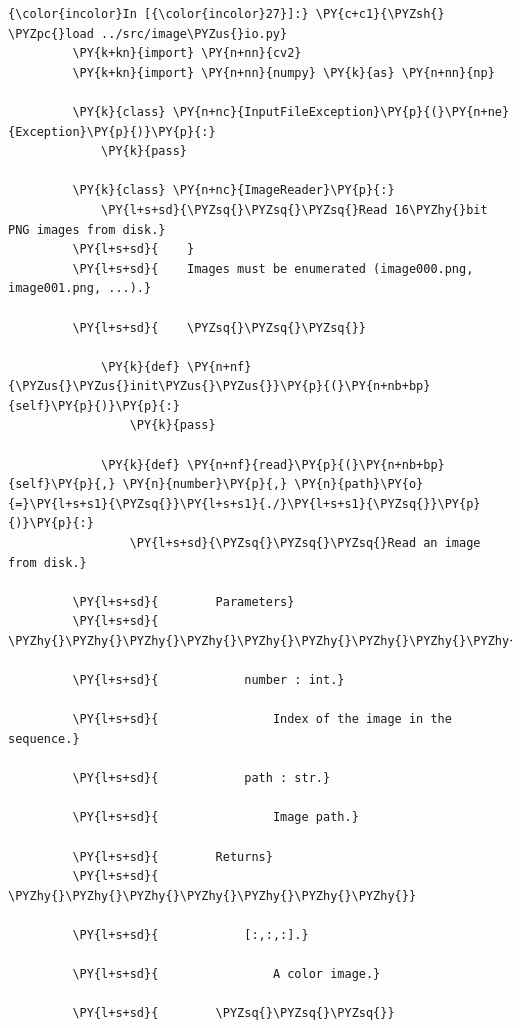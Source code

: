     \begin{Verbatim}[commandchars=\\\{\}]
{\color{incolor}In [{\color{incolor}27}]:} \PY{c+c1}{\PYZsh{} \PYZpc{}load ../src/image\PYZus{}io.py}
         \PY{k+kn}{import} \PY{n+nn}{cv2}
         \PY{k+kn}{import} \PY{n+nn}{numpy} \PY{k}{as} \PY{n+nn}{np}
         
         \PY{k}{class} \PY{n+nc}{InputFileException}\PY{p}{(}\PY{n+ne}{Exception}\PY{p}{)}\PY{p}{:}
             \PY{k}{pass}
         
         \PY{k}{class} \PY{n+nc}{ImageReader}\PY{p}{:}
             \PY{l+s+sd}{\PYZsq{}\PYZsq{}\PYZsq{}Read 16\PYZhy{}bit PNG images from disk.}
         \PY{l+s+sd}{    }
         \PY{l+s+sd}{    Images must be enumerated (image000.png, image001.png, ...).}
         
         \PY{l+s+sd}{    \PYZsq{}\PYZsq{}\PYZsq{}}
         
             \PY{k}{def} \PY{n+nf}{\PYZus{}\PYZus{}init\PYZus{}\PYZus{}}\PY{p}{(}\PY{n+nb+bp}{self}\PY{p}{)}\PY{p}{:}
                 \PY{k}{pass}
         
             \PY{k}{def} \PY{n+nf}{read}\PY{p}{(}\PY{n+nb+bp}{self}\PY{p}{,} \PY{n}{number}\PY{p}{,} \PY{n}{path}\PY{o}{=}\PY{l+s+s1}{\PYZsq{}}\PY{l+s+s1}{./}\PY{l+s+s1}{\PYZsq{}}\PY{p}{)}\PY{p}{:}
                 \PY{l+s+sd}{\PYZsq{}\PYZsq{}\PYZsq{}Read an image from disk.}
         
         \PY{l+s+sd}{        Parameters}
         \PY{l+s+sd}{        \PYZhy{}\PYZhy{}\PYZhy{}\PYZhy{}\PYZhy{}\PYZhy{}\PYZhy{}\PYZhy{}\PYZhy{}\PYZhy{}}
         
         \PY{l+s+sd}{            number : int.}
         
         \PY{l+s+sd}{                Index of the image in the sequence.}
         
         \PY{l+s+sd}{            path : str.}
         
         \PY{l+s+sd}{                Image path.}
         
         \PY{l+s+sd}{        Returns}
         \PY{l+s+sd}{        \PYZhy{}\PYZhy{}\PYZhy{}\PYZhy{}\PYZhy{}\PYZhy{}\PYZhy{}}
         
         \PY{l+s+sd}{            [:,:,:].}
         
         \PY{l+s+sd}{                A color image.}
         
         \PY{l+s+sd}{        \PYZsq{}\PYZsq{}\PYZsq{}}
         

\end{Verbatim}
